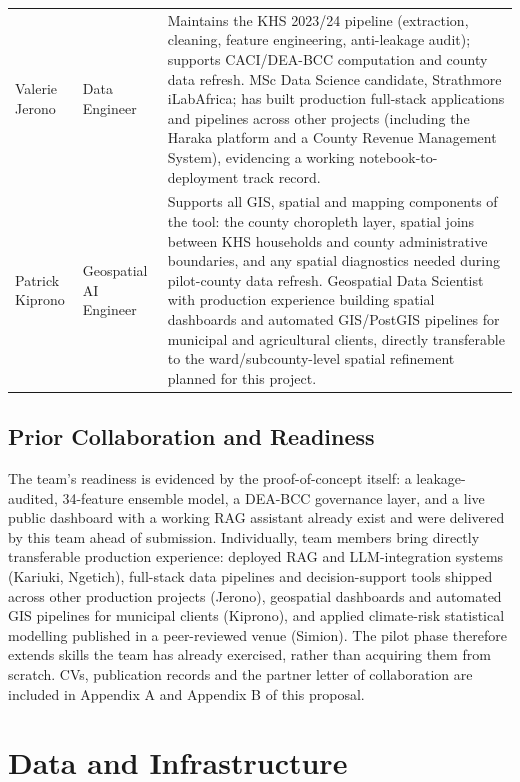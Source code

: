\documentclass[12pt,a4paper]{article}
\begin{document}
\begin{center}
\begin{tabular}{@{}p{2.3cm}p{2.7cm}p{9.3cm}@{}}
\addlinespace
Valerie Jerono & Data Engineer &
Maintains the KHS 2023/24 pipeline (extraction, cleaning, feature engineering, anti-leakage audit); supports CACI/DEA-BCC computation and county data refresh. MSc Data Science candidate, Strathmore iLabAfrica; has built production full-stack applications and pipelines across other projects (including the Haraka platform and a County Revenue Management System), evidencing a working notebook-to-deployment track record. \\
\addlinespace
Patrick Kiprono & Geospatial AI Engineer &
Supports all GIS, spatial and mapping components of the tool: the county choropleth layer, spatial joins between KHS households and county administrative boundaries, and any spatial diagnostics needed during pilot-county data refresh. Geospatial Data Scientist with production experience building spatial dashboards and automated GIS/PostGIS pipelines for municipal and agricultural clients, directly transferable to the ward/subcounty-level spatial refinement planned for this project. \\
\bottomrule
\end{tabular}
\end{center}

\subsection{Prior Collaboration and Readiness}
The team's readiness is evidenced by the proof-of-concept itself: a leakage-audited, 34-feature ensemble model, a DEA-BCC governance layer, and a live public dashboard with a working RAG assistant already exist and were delivered by this team ahead of submission. Individually, team members bring directly transferable production experience: deployed RAG and LLM-integration systems (Kariuki, Ngetich), full-stack data pipelines and decision-support tools shipped across other production projects (Jerono), geospatial dashboards and automated GIS pipelines for municipal clients (Kiprono), and applied climate-risk statistical modelling published in a peer-reviewed venue (Simion). The pilot phase therefore extends skills the team has already exercised, rather than acquiring them from scratch. CVs, publication records and the partner letter of collaboration are included in Appendix A and Appendix B of this proposal.

\newpage
\section{Data and Infrastructure}
\end{document}
